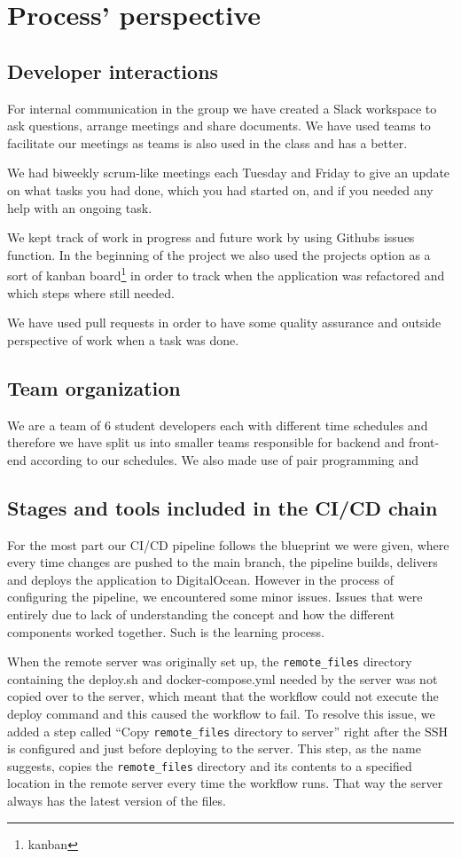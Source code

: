 \documentclass{article}
\begin{document}
\section{Process' perspective}
\subsection{Developer interactions}
For internal communication in the group we have created a Slack workspace to ask questions, arrange meetings and share documents. We have used teams to facilitate our meetings as teams is also used in the class and has a better.

We had biweekly scrum-like meetings each Tuesday and Friday to give an update on what tasks you had done, which you had started on, and if you needed any help with an ongoing task.

We kept track of work in progress and future work by using Githubs issues function. In the beginning of the project we also used the projects option as a sort of kanban board\footnote{kanban} in order to track when the application was refactored and which steps where still needed. 

We have used pull requests in order to have some quality assurance and outside perspective of work when a task was done. 
\subsection{Team organization}
We are a team of 6 student developers each with different time schedules and therefore we have split us into smaller teams responsible for backend and front-end according to our schedules. We also made use of pair programming and 
\subsection{Stages and tools included in the CI/CD chain}
For the most part our CI/CD pipeline follows the blueprint we were given, where every time changes are pushed to the main branch, the pipeline builds, delivers and deploys the application to DigitalOcean. However in the process of configuring the pipeline, we encountered some minor issues. Issues that were entirely due to lack of understanding the concept and how the different components worked together. Such is the learning process.

When the remote server was originally set up, the \verb|remote_files| directory containing the deploy.sh and docker-compose.yml needed by the server was not copied over to the server, which meant that the workflow could not execute the deploy command and this caused the workflow to fail. To resolve this issue, we added a step called “Copy \verb|remote_files| directory to server” right after the SSH is configured and just before deploying to the server. This step, as the name suggests, copies the \verb|remote_files| directory and its contents to a specified location in the remote server every time the workflow runs. That way the server always has the latest version of the files.
\end{document}
